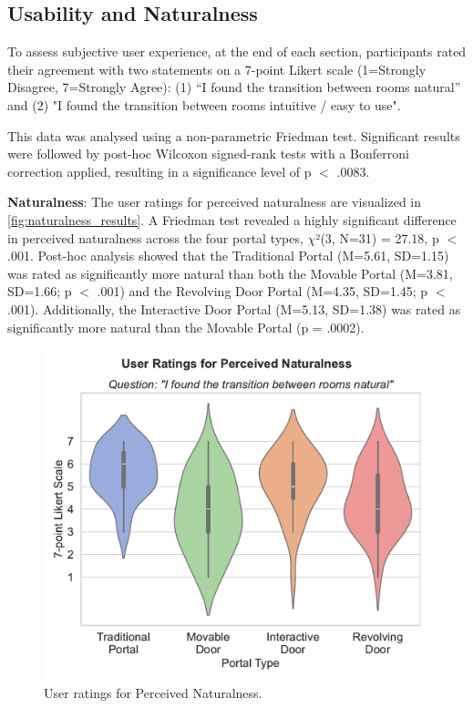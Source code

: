 \subsection{Usability and Naturalness}
\label{sec:usability-naturalness}

To assess subjective user experience, at the end of each section, participants rated their agreement with two statements on a 7-point Likert 
scale (1=Strongly Disagree, 7=Strongly Agree): (1) “I found the transition between rooms natural” and 
(2) "I found the transition between rooms intuitive / easy to use". 


This data was analysed using a non-parametric Friedman test. Significant results were followed by post-hoc Wilcoxon signed-rank tests with a Bonferroni 
correction applied, resulting in a significance level of p $<$ .0083.

\textbf{Naturalness}: The user ratings for perceived naturalness are visualized in \autoref{fig:naturalness_results}. 
A Friedman test revealed a highly significant difference in perceived naturalness across the four portal types, $\chi$²(3, N=31) = 27.18, 
p $<$ .001. Post-hoc analysis showed that the Traditional Portal (M=5.61, SD=1.15) was rated as significantly more natural than both the 
Movable Portal (M=3.81, SD=1.66; p $<$ .001) and the Revolving Door Portal (M=4.35, SD=1.45; p $<$ .001). Additionally, 
the Interactive Door Portal (M=5.13, SD=1.38) was rated as significantly more natural than the Movable Portal (p = .0002).

\begin{figure}[t]
\centering
\includegraphics[width=.6\linewidth]{NOVAthesisFiles/Images/graphs/naturalness_violin_plot.pdf}
\caption{User ratings for Perceived Naturalness.}
\label{fig:naturalness_results}
\end{figure}

